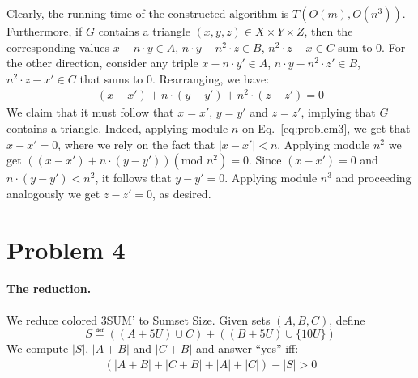 
Clearly, the running time of the constructed algorithm is $T(O(m), O(n^3))$.
Furthermore, if $G$ contains a triangle $(x,y,z)\in X\times Y\times Z$, then the corresponding values $x-n\cdot y\in A$, $n\cdot y-n^2\cdot z \in B$, $n^2\cdot z-x\in C$ sum to $0$.
For the other direction, consider any triple $x-n\cdot y'\in A$, $n\cdot y-n^2\cdot z' \in B$, $n^2\cdot z-x'\in C$ that sums to $0$.
Rearranging, we have: 
\begin{align}\label{eq:problem3}
    (x-x') + n\cdot (y-y') + n^2\cdot (z-z') = 0
\end{align}
We claim that it must follow that $x=x'$, $y=y'$ and $z=z'$, implying that $G$ contains a triangle.
Indeed, applying module $n$ on Eq.~\eqref{eq:problem3}, we get that $x-x' = 0$, where we rely on the fact that $|x-x'| < n$.
Applying module $n^2$ we get $\left( (x-x') + n\cdot (y-y') \right) (\text{mod } n^2) = 0$. 
Since $(x-x') = 0$ and $n\cdot (y-y') < n^2$, it follows that $y-y' = 0$. 
Applying module $n^3$ and proceeding analogously we get $z-z' = 0$, as desired.






\section{Problem 4}

\paragraph{The reduction.} 
We reduce colored 3SUM' to Sumset Size.
Given sets $(A,B,C)$, define 
$$
    S \eqdef \left( (A+5U) \cup C \right) +  \left( (B+5U) \cup \{10U\} \right)
$$ 
We compute $|S|$, $|A+B|$ and $|C+B|$ and answer ``yes'' iff: 
\begin{align}\label{eq:problem4}
    \left( |A+B| + |C+B| + |A| + |C| \right) - |S| > 0
\end{align}

